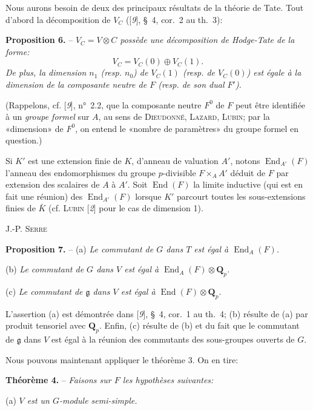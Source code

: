 Nous aurons besoin de deux des principaux résultats de la théorie de Tate. Tout d’abord la décomposition de $V_C$ ([\textit{9}], \S~4, cor.~2 au th.~3):

\textbf{Proposition 6.} -- \textit{$V_C=V\otimes C$ possède une décomposition de Hodge-Tate de la forme:}
\[
V_C=V_C(0)\oplus V_C(1).
\]
\textit{De plus, la dimension $n_1$ (resp. $n_0$) de $V_C(1)$ (resp. de $V_C(0)$) est égale à la dimension de la composante neutre de $F$ (resp. de son dual $F'$).}

(Rappelons, cf. [\textit{9}], n°~2.2, que la composante neutre $F^0$ de $F$ peut être identifiée à un \textit{groupe formel} sur $A$, au sens de \textsc{Dieudonné}, \textsc{Lazard}, \textsc{Lubin}; par la «dimension» de $F^0$, on entend le «nombre de paramètres» du groupe formel en question.)

Si $K'$ est une extension finie de $K$, d’anneau de valuation $A'$, notons $\operatorname{End}_{A'}(F)$ l’anneau des endomorphismes du groupe $p$-divisible $F\times_A A'$ déduit de $F$ par extension des scalaires de $A$ à $A'$. Soit $\operatorname{End}(F)$ la limite inductive (qui est en fait une réunion) des $\operatorname{End}_{A'}(F)$ lorsque $K'$ parcourt toutes les sous-extensions finies de $\bar K$ (cf. \textsc{Lubin} [\textit{2}] pour le cas de dimension 1).
\begin{center}\small J.-P. \textsc{Serre}\end{center}
\textbf{Proposition 7.} -- (a) \textit{Le commutant de $G$ dans $T$ est égal à $\operatorname{End}_A(F)$.}

(b) \textit{Le commutant de $G$ dans $V$ est égal à $\operatorname{End}_A(F)\otimes\mathbf{Q}_p$.}

(c) \textit{Le commutant de $\mathfrak{g}$ dans $V$ est égal à $\operatorname{End}(F)\otimes\mathbf{Q}_p$.}

L’assertion (a) est démontrée dans [\textit{9}], \S~4, cor.~1 au th.~4; (b) résulte de (a) par produit tensoriel avec $\mathbf{Q}_p$. Enfin, (c) résulte de (b) et du fait que le commutant de $\mathfrak{g}$ dans $V$ est égal à la réunion des commutants des sous-groupes ouverts de $G$.

Nous pouvons maintenant appliquer le théorème 3. On en tire:

\textbf{Théorème 4.} -- \textit{Faisons sur $F$ les hypothèses suivantes:}

(a) \textit{$V$ est un $G$-module semi-simple.}

